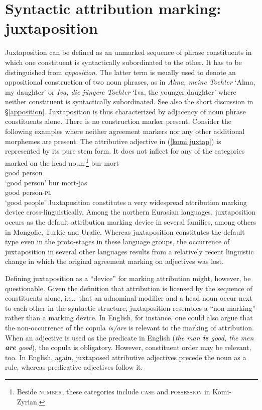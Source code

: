 \section[Juxtaposition]{Syntactic attribution marking: juxtaposition} \label{juxtaposition}
Juxtaposition can be defined as an unmarked sequence of phrase constituents in which one constituent is syntactically subordinated to the other. It has to be distinguished from \emph{apposition}. The latter term is usually used to denote an appositional construction of two noun phrases, as in \textit{Alma, meine Tochter} ‘Alma, my daughter’ or \textit{Iva, die jüngere Tochter} ‘Iva, the younger daughter’ where neither constituent is syntactically subordinated. See also the short discussion in \S\ref{apposition}. Juxtaposition is thus characterized by adjacency of noun phrase constituents alone. There is no construction marker present. Consider the following  examples where neither agreement markers nor any other additional morphemes are present. The attributive adjective in (\ref{komi juxtap}) is represented by its pure stem form. It does not inflect for any of the categories marked on the head noun.\footnote{Beside \textsc{number}, these categories include \textsc{case} and \textsc{possession} in Komi-Zyrian.}
\ea
\label{komi juxtap}
\ea
\gll 	bur 	mort\\
		good	person\\
\glt		‘good person’
\ex
\gll 	bur	mort-jas\\
		good	person-\textsc{pl}\\
\glt		‘good people’
\z
\z
Juxtaposition constitutes a very widespread attribution marking device cross-linguistically. Among the northern Eurasian languages, juxtaposition occurs as the default attribution marking device in several families, among others in Mongolic, Turkic and Uralic. Whereas juxtaposition constitutes the default type even in the proto-stages in these language groups, the occurrence of juxtaposition in several other languages results from a relatively recent linguistic change in which the original agreement marking on adjectives was lost.

Defining juxtaposition as a “device” for marking attribution might, however, be questionable. Given the definition that attribution is licensed by the sequence of constituents alone, i.e.,~that an adnominal modifier and a head noun occur next to each other in the syntactic structure, juxtaposition resembles a “non-marking” rather than a marking device. In English, for instance, one could also argue that the non-occurrence of the copula \textit{is\slash{}are} is relevant to the marking of attribution. When an adjective is used as the predicate in English (\textit{the man \textbf{is} good, the men \textbf{are} good}), the copula is obligatory. However, constituent order may be relevant, too. In English, again, juxtaposed attributive adjectives precede the noun as a rule, whereas predicative adjectives follow it. 

